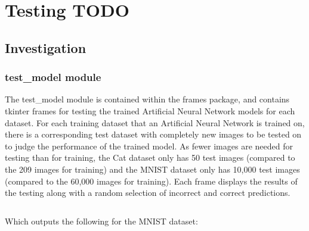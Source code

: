 \documentclass[./project-report/src/latex/project-report.tex]{subfiles}
\begin{document}
\maketitle

\section{Testing TODO}

\subsection{Investigation}

\subsubsection{test\_model module}

The test\_model module is contained within the frames package, and contains tkinter frames for testing the trained Artificial Neural Network models for each dataset. 
For each training dataset that an Artificial Neural Network is trained on, there is a corresponding test dataset with completely new images to be tested on to judge 
the performance of the trained model. As fewer images are needed for testing than for training, the Cat dataset only has 50 test images (compared to the 209 images 
for training) and the MNIST dataset only has 10,000 test images (compared to the 60,000 images for training).
Each frame displays the results of the testing along with a random selection of incorrect and correct predictions.

\inputminted{python}{./school_project/frames/test_model.py}

Which outputs the following for the MNIST dataset:

\pagebreak

\begin{figure}[h!]
\centering
{}
\end{figure}
\end{document}
